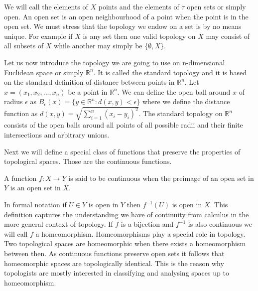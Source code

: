 We will call the elements of $X$ points and the elements of $\tau$ open sets or simply open. An open set is an open neighbourhood of a point when the point is in the open set. We must stress that the topology we endow on a set is by no means unique. For example if $X$ is any set then one valid topology on $X$ may consist of all subsets of $X$ while another may simply be $\{\emptyset, X\}$.

Let us now introduce the topology we are going to use on n-dimensional Euclidean space or simply $\mathbb{R}^n$. It is called the standard topology and it is based on the standard definition of distance between points in $\mathbb{R}^n$. Let $x = (x_1, x_2, ..., x_n)$ be a point in $\mathbb{R}^n$. We can define the open ball around $x$ of radius $\epsilon$ as $B_\epsilon(x) = \{y \in \mathbb{R}^n: d(x, y) < \epsilon\}$ where we define the distance function as $d(x, y) = \sqrt{\sum_{i=1}^n{(x_i - y_i)^2}}$. The standard topology on $\mathbb{R}^n$ consists of the open balls around all points of all possible radii and their finite intersections and arbitrary unions.


Next we will define a special class of functions that preserve the properties of topological spaces. Those are the continuous functions.

\begin{defn} A function $f : X \to Y$ is said to be continuous when the preimage of an open set in $Y$ is an open set in $X$. \end{defn}

In formal notation if $U \in Y$ is open in $Y$ then $f^{-1}(U)$ is open in $X$. This definition captures the understanding we have of continuity from calculus in the more general context of topology. If $f$ is a bijection and $f^{-1}$ is also continuous we will call $f$ a homeomorphism. Homeomorphisms play a special role in topology. Two topological spaces are homeomorphic when there exists a homeomorphism between then. As continuous functions preserve open sets it follows that homeomorphic spaces are topologically identical. This is the reason why topologists are mostly interested in classifying and analysing spaces up to homeomorphism.




